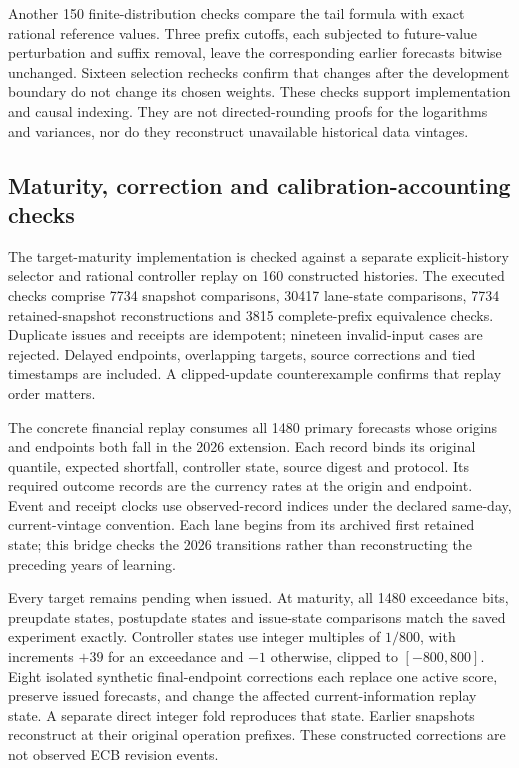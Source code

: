\documentclass[11pt,a4paper]{article}
\theoremstyle{definition}\newtheorem{definition}[theorem]{Definition}
\begin{document}
Another 150 finite-distribution checks compare the tail formula with exact rational reference values. Three prefix cutoffs, each subjected to future-value perturbation and suffix removal, leave the corresponding earlier forecasts bitwise unchanged. Sixteen selection rechecks confirm that changes after the development boundary do not change its chosen weights. These checks support implementation and causal indexing. They are not directed-rounding proofs for the logarithms and variances, nor do they reconstruct unavailable historical data vintages.


\subsection{Maturity, correction and calibration-accounting checks}\label{sec:adaptivematurityresults}
The target-maturity implementation is checked against a separate explicit-history selector and rational controller replay on 160 constructed histories. The executed checks comprise 7734 snapshot comparisons, 30417 lane-state comparisons, 7734 retained-snapshot reconstructions and 3815 complete-prefix equivalence checks. Duplicate issues and receipts are idempotent; nineteen invalid-input cases are rejected. Delayed endpoints, overlapping targets, source corrections and tied timestamps are included. A clipped-update counterexample confirms that replay order matters.

The concrete financial replay consumes all 1480 primary forecasts whose origins and endpoints both fall in the 2026 extension. Each record binds its original quantile, expected shortfall, controller state, source digest and protocol. Its required outcome records are the currency rates at the origin and endpoint. Event and receipt clocks use observed-record indices under the declared same-day, current-vintage convention. Each lane begins from its archived first retained state; this bridge checks the 2026 transitions rather than reconstructing the preceding years of learning.

Every target remains pending when issued. At maturity, all 1480 exceedance bits, preupdate states, postupdate states and issue-state comparisons match the saved experiment exactly. Controller states use integer multiples of $1/800$, with increments $+39$ for an exceedance and $-1$ otherwise, clipped to $[-800,800]$. Eight isolated synthetic final-endpoint corrections each replace one active score, preserve issued forecasts, and change the affected current-information replay state. A separate direct integer fold reproduces that state. Earlier snapshots reconstruct at their original operation prefixes. These constructed corrections are not observed ECB revision events.
\end{document}

